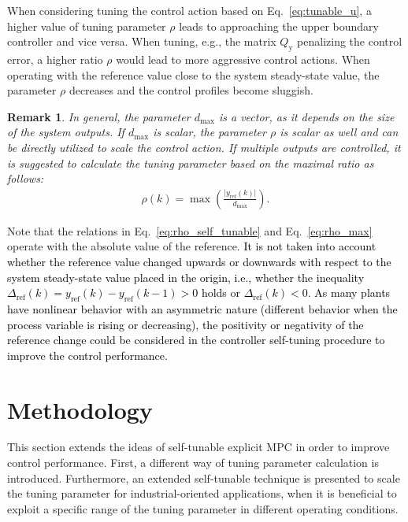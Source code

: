 \documentclass[preprint,12pt]{elsarticle}
\newcommand{\change}[1]{\textcolor{black}{#1}}
\newtheorem{remark}[theorem]{Remark}
\begin{document}
	When considering tuning the control action based on Eq.~\eqref{eq:tunable_u}, a higher value of tuning parameter $\rho$ leads to approaching the upper boundary controller and vice versa. When tuning, e.g., the matrix $Q_\mathrm{y}$ penalizing the control error, a higher ratio $\rho$ would lead to more aggressive control actions. When operating with the reference value close to the system steady-state value, the parameter $\rho$ decreases and the control profiles become sluggish.
	
	\begin{remark}
		In general, the parameter $d_{\max}$ is a vector, as it depends on the size of the system outputs. If $d_{\max}$ is scalar, the parameter $\rho$ is scalar as well and can be directly utilized to scale the control action. If multiple outputs are controlled, it is suggested to calculate the tuning parameter based on the maximal ratio as follows:
		\begin{eqnarray}
			\label{eq:rho_max}
			\rho(k) = \max \left( \frac{\vert y_{\mathrm{ref}}(k) \vert}{d_{\max}} \right).
		\end{eqnarray}
	\end{remark}
	
	Note that the relations in Eq.~\eqref{eq:rho_self_tunable} and Eq.~\eqref{eq:rho_max} operate with the absolute value of the reference. \change{It is not taken into account whether the reference value changed upwards or downwards with respect to the system steady-state value placed in the origin, i.e., whether the inequality $\Delta_\mathrm{ref}(k) = y_\mathrm{ref}(k)-y_\mathrm{ref}(k-1) > 0$ holds or $\Delta_\mathrm{ref}(k) < 0$. As many plants have nonlinear behavior with an asymmetric nature (different behavior when the process variable is rising or decreasing), the positivity or negativity of the reference change could be considered in the controller self-tuning procedure to improve the control performance.}
	
	
	\section{Methodology}
	\label{sec:methodology}
	This section extends the ideas of self-tunable explicit MPC in order to improve control performance. First, a different way of tuning parameter calculation is introduced. Furthermore, an extended self-tunable technique is presented to scale the tuning parameter for industrial-oriented applications, when it is beneficial to exploit a specific range of the tuning parameter in different operating conditions. 
	
\end{document}
